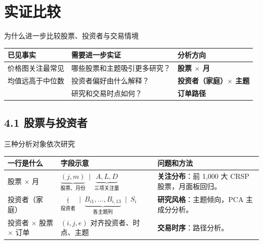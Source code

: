 \section{实证比较}

\begin{frame}[label=empirical-why]{为什么进一步比较股票、投资者与交易情境}
  \small
  \setlength{\tabcolsep}{5pt}
  \renewcommand{\arraystretch}{1.35}
  \begin{tabularx}{\linewidth}{@{}L{.29\linewidth}YL{.24\linewidth}@{}}
    \toprule{}
    \textbf{已见事实} & \textbf{需要进一步实证} & \textbf{分析方向}\\\midrule
    价格图关注最常见 & 哪些股票和主题吸引更多研究？ & \textcolor{wine}{\textbf{股票 \(\times\) 月}}\\
    均值远高于中位数 & 投资者偏好由什么解释？ & \textcolor{wine}{\textbf{投资者（家庭）\(\times\) 主题}}\\
     & 研究和交易时点如何？ & \textcolor{wine}{\textbf{订单路径}}\\\bottomrule
  \end{tabularx}\par\medskip
\end{frame}

\subsection{4.1 股票与投资者}
\begin{frame}[label=slices]{三种分析对象依次研究}
  \small
  \begin{tabularx}{\linewidth}{@{}L{.24\linewidth}YY@{}}
    \toprule 一行是什么 & 字段示意 & 问题和方法\\\midrule
    股票 \(\times\) 月 & \(\underbrace{(j,m)}_{\text{股票、月份}}\ \mid\ \underbrace{A,L,D}_{\text{三项关注量}}\) &
      \textbf{关注分布}：前 1,000 大 CRSP 股票，月面板回归。\\\midrule
    投资者（家庭） & \(\underbrace{i}_{\text{投资者}}\ \mid\ \underbrace{B_{i1},\ldots,B_{i,13}}_{\text{各主题列}}\ \mid\ S_i\) &
      \textbf{研究风格}：主题倾向，PCA 主成分分析。\\\midrule
    投资者 \(\times\) 股票 \(\times\) 订单 &
      \((i,j,e)\) 对齐投资者、时点、主题 &
      \textbf{交易时序}：路径分析。\\
    \bottomrule
  \end{tabularx}
\end{frame}

